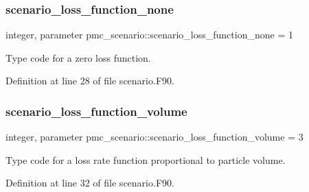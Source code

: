 \subsubsection{\texorpdfstring{scenario\+\_\+loss\+\_\+function\+\_\+none}{scenario\_loss\_function\_none}}
{\footnotesize\ttfamily integer, parameter pmc\+\_\+scenario\+::scenario\+\_\+loss\+\_\+function\+\_\+none = 1}



Type code for a zero loss function. 



Definition at line 28 of file scenario.\+F90.

\mbox{\label{namespacepmc__scenario_ad3122dfa9b3c59624cdef63b4ebd807d}} 
\subsubsection{\texorpdfstring{scenario\+\_\+loss\+\_\+function\+\_\+volume}{scenario\_loss\_function\_volume}}
{\footnotesize\ttfamily integer, parameter pmc\+\_\+scenario\+::scenario\+\_\+loss\+\_\+function\+\_\+volume = 3}



Type code for a loss rate function proportional to particle volume. 



Definition at line 32 of file scenario.\+F90.

